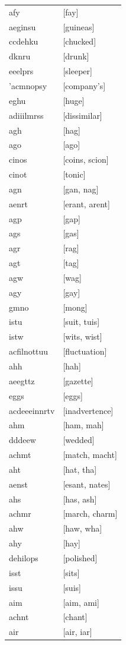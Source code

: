 \documentclass{article}
\begin{document}
\begin{tabular}{ll}
afy & [fay] \\
aeginsu & [guineas] \\
ccdehku & [chucked] \\
dknru & [drunk] \\
eeelprs & [sleeper] \\
'acmnopsy & [company's] \\
eghu & [huge] \\
adiiilmrss & [dissimilar] \\
agh & [hag] \\
ago & [ago] \\
cinos & [coins, scion] \\
cinot & [tonic] \\
agn & [gan, nag] \\
aenrt & [erant, arent] \\
agp & [gap] \\
ags & [gas] \\
agr & [rag] \\
agt & [tag] \\
agw & [wag] \\
agy & [gay] \\
gmno & [mong] \\
istu & [suit, tuis] \\
istw & [wits, wist] \\
acfilnottuu & [fluctuation] \\
ahh & [hah] \\
aeegttz & [gazette] \\
eggs & [eggs] \\
acdeeeinnrtv & [inadvertence] \\
ahm & [ham, mah] \\
dddeew & [wedded] \\
achmt & [match, macht] \\
aht & [hat, tha] \\
aenst & [esant, nates] \\
ahs & [has, ash] \\
achmr & [march, charm] \\
ahw & [haw, wha] \\
ahy & [hay] \\
dehilops & [polished] \\
isst & [sits] \\
issu & [suis] \\
aim & [aim, ami] \\
achnt & [chant] \\
air & [air, iar] \\

\end{tabular}
\end{document}
